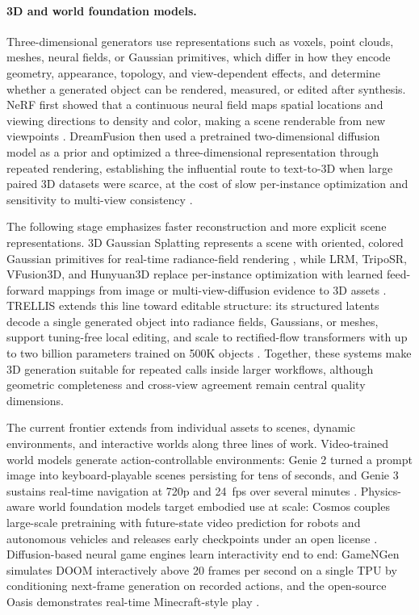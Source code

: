 \paragraph{3D and world foundation models.}
Three-dimensional generators use representations such as voxels, point clouds, meshes, neural fields, or Gaussian primitives, which differ in how they encode geometry, appearance, topology, and view-dependent effects, and determine whether a generated object can be rendered, measured, or edited after synthesis. NeRF first showed that a continuous neural field maps spatial locations and viewing directions to density and color, making a scene renderable from new viewpoints \cite{mildenhall2020nerf}. DreamFusion then used a pretrained two-dimensional diffusion model as a prior and optimized a three-dimensional representation through repeated rendering, establishing the influential route to text-to-3D when large paired 3D datasets were scarce, at the cost of slow per-instance optimization and sensitivity to multi-view consistency \cite{poole2022dreamfusion}.

The following stage emphasizes faster reconstruction and more explicit scene representations. 3D Gaussian Splatting represents a scene with oriented, colored Gaussian primitives for real-time radiance-field rendering \cite{kerbl2023gaussiansplatting}, while LRM, TripoSR, VFusion3D, and Hunyuan3D replace per-instance optimization with learned feed-forward mappings from image or multi-view-diffusion evidence to 3D assets \cite{lrm2023,triposr2024,vfusion3d2024,hunyuan3d2024}. TRELLIS extends this line toward editable structure: its structured latents decode a single generated object into radiance fields, Gaussians, or meshes, support tuning-free local editing, and scale to rectified-flow transformers with up to two billion parameters trained on 500K objects \cite{xiang2024trellis}. Together, these systems make 3D generation suitable for repeated calls inside larger workflows, although geometric completeness and cross-view agreement remain central quality dimensions.

The current frontier extends from individual assets to scenes, dynamic environments, and interactive worlds along three lines of work. Video-trained world models generate action-controllable environments: Genie 2 turned a prompt image into keyboard-playable scenes persisting for tens of seconds, and Genie 3 sustains real-time navigation at 720p and 24~fps over several minutes \cite{parkerholder2024genie2,parkerholder2025genie3}. Physics-aware world foundation models target embodied use at scale: Cosmos couples large-scale pretraining with future-state video prediction for robots and autonomous vehicles and releases early checkpoints under an open license \cite{nvidia2025cosmos}. Diffusion-based neural game engines learn interactivity end to end: GameNGen simulates DOOM interactively above 20 frames per second on a single TPU by conditioning next-frame generation on recorded actions, and the open-source Oasis demonstrates real-time Minecraft-style play \cite{valevski2024gamengen,decart2024oasis}.

